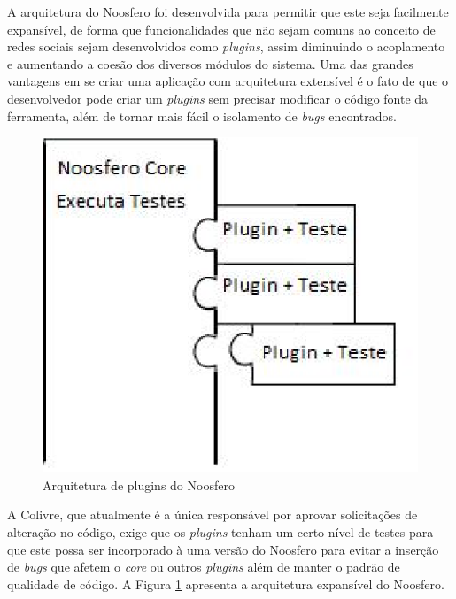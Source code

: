 
A arquitetura do Noosfero foi desenvolvida para permitir que este seja facilmente
expansível, de forma que funcionalidades que não sejam comuns ao conceito de
redes sociais sejam desenvolvidos como \textit{plugins}, assim diminuindo
o acoplamento e aumentando a coesão dos diversos módulos do sistema.
%
Uma das grandes vantagens em se criar uma aplicação com arquitetura extensível
é o fato de que o desenvolvedor pode criar um \textit{plugins}
sem precisar modificar o código fonte da ferramenta, além de tornar mais
fácil o isolamento de \textit{bugs} encontrados. 

\begin{figure}[h]
	\centering
	\includegraphics[keepaspectratio=true,scale=0.6]{figuras/plugins.eps}
	\caption{Arquitetura de plugins do Noosfero}
	\label{plugins}
\end{figure}

A Colivre, que atualmente é a única responsável por aprovar solicitações de
alteração no código, exige que os \textit{plugins} tenham um certo nível de
testes para que este possa ser incorporado à uma versão do Noosfero para
evitar a inserção de \textit{bugs} que afetem o \textit{core} ou
outros \textit{plugins} além de manter o padrão de qualidade de código. A
Figura \ref{plugins} apresenta a arquitetura expansível do Noosfero.

